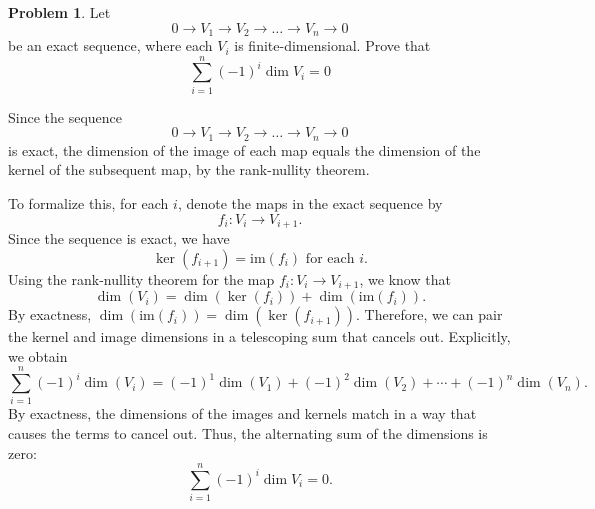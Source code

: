 \documentclass[12pt]{article}
\theoremstyle{definition}
\newtheorem{problem}{Problem}
\begin{document}
\begin{problem}
    Let
    \[0 \rightarrow V_1 \rightarrow V_2 \rightarrow \ldots \rightarrow V_n \rightarrow 0\]
    be an exact sequence, where each $V_i$ is finite-dimensional. Prove that
    \[\sum_{i = 1}^{n}(-1)^i \dim{V_i} = 0\]

    \begin{solution}
        Since the sequence 
        \[0 \rightarrow V_1 \rightarrow V_2 \rightarrow \ldots \rightarrow V_n \rightarrow 0\]
        is exact, the dimension of the image of each map equals the dimension of the kernel of the subsequent map, by the rank-nullity theorem.

        To formalize this, for each $i$, denote the maps in the exact sequence by
        \[
        f_i: V_i \rightarrow V_{i+1}.
        \]
        Since the sequence is exact, we have 
        \[
        \ker(f_{i+1}) = \mathrm{im}(f_i) \text{ for each } i.
        \]
        Using the rank-nullity theorem for the map $f_i: V_i \rightarrow V_{i+1}$, we know that
        \[
        \dim(V_i) = \dim(\ker(f_i)) + \dim(\mathrm{im}(f_i)).
        \]
        By exactness, $\dim(\mathrm{im}(f_i)) = \dim(\ker(f_{i+1}))$. Therefore, we can pair the kernel and image dimensions in a telescoping sum that cancels out. Explicitly, we obtain
        \[
        \sum_{i=1}^{n} (-1)^i \dim(V_i) = (-1)^1 \dim(V_1) + (-1)^2 \dim(V_2) + \cdots + (-1)^n \dim(V_n).
        \]
        By exactness, the dimensions of the images and kernels match in a way that causes the terms to cancel out. Thus, the alternating sum of the dimensions is zero:
        \[
        \sum_{i=1}^{n}(-1)^i \dim{V_i} = 0.
        \]

    \end{solution}
\end{problem}
\end{document}
